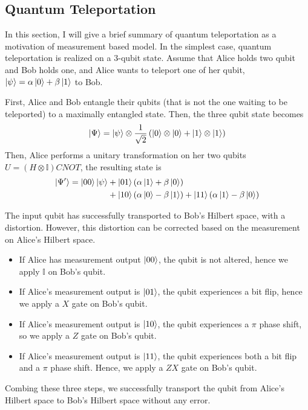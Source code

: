 \documentclass[twocolumn,secnumarabic,amssymb, nobibnotes, aps, prd]{revtex4-2}
\begin{document}
\subsection{Quantum Teleportation}
In this section, I will give a brief summary of quantum teleportation as a motivation of measurement based model. In the simplest case, quantum teleportation is realized on a $3$-qubit state. Assume that Alice holds two qubit and Bob holds one, and Alice wants to teleport one of her qubit, $\ket{\psi} = \alpha\ket{0} + \beta \ket{1}$ to Bob.\par
First, Alice and Bob entangle their qubits (that is not the one waiting to be teleported) to a maximally entangled state. Then, the three qubit state becomes
\begin{align*}
    \ket{\Psi} = \ket{\psi} \otimes \frac{1}{\sqrt{2}} \left(\ket{0} \otimes \ket{0} + \ket{1} \otimes \ket{1}\right)
\end{align*}
Then, Alice performs a unitary transformation on her two qubits $U = (H \otimes \mathbb{I})CNOT$, the resulting state is
\begin{align*}
    \ket{\Psi'} = \ket{00}\ket{\psi} &+ \ket{01}(\alpha\ket{1} + \beta\ket{0}) \\&+ \ket{10}(\alpha\ket{0} - \beta\ket{1}) + \ket{11}(\alpha\ket{1} - \beta\ket{0})
\end{align*}\par
The input qubit has successfully transported to Bob's Hilbert space, with a distortion. However, this distortion can be corrected based on the measurement on Alice's Hilbert space.\par
\begin{itemize}
    \item If Alice has measurement output $\ket{00}$, the qubit is not altered, hence we apply $\mathbb{I}$ on Bob's qubit.
    \item If Alice's measurement output is $\ket{01}$, the qubit experiences a bit flip, hence we apply a $X$ gate on Bob's qubit.
    \item If Alice's measurement output is $\ket{10}$, the qubit experiences a $\pi$ phase shift, so we apply a $Z$ gate on Bob's qubit.
    \item If Alice's measurement output is $\ket{11}$, the qubit experiences both a bit flip and a $\pi$ phase shift. Hence, we apply a $ZX$ gate on Bob's qubit.
\end{itemize}
Combing these three steps, we successfully transport the qubit from Alice's Hilbert space to Bob's Hilbert space without any error.\par
\end{document}
